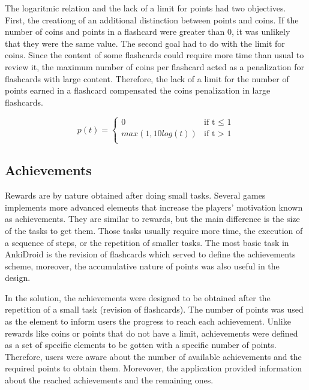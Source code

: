 The logaritmic relation and the lack of a limit for points had two objectives. First, the creationg of an additional distinction between points and coins. If the number of coins and points in a flashcard were greater than 0, it was unlikely that they were the same value. The second goal had to do with the limit for coins. Since the content of some flashcards could require more time than usual to review it, the maximum number of coins per flashcard acted as a penalization for flashcards with large content. Therefore, the lack of a limit for the number of points earned in a flashcard compensated the coins penalization in large flashcards.

\begin{equation}
  p(t) =
      \begin{cases}
        0 & \text{if t $\leq$ 1}\\
        max(1, 10log(t)) & \text{if t $>$ 1}\\
      \end{cases}
    \label{eq:points-formula}
\end{equation}

\subsection{Achievements}
Rewards are by nature obtained after doing small tasks. Several games implements more advanced elements that increase the players' motivation known as achievements. They are similar to rewards, but the main difference is the size of the tasks to get them. Those tasks usually require more time, the execution of a sequence of steps, or the repetition of smaller tasks. The most basic task in AnkiDroid is the revision of flashcards which served to define the achievements scheme, moreover, the accumulative nature of points was also useful in the design.

In the solution, the achievements were designed to be obtained after the repetition of a small task (revision of flashcards). The number of points was used as the element to inform users the progress to reach each achievement. Unlike rewards like coins or points that do not have a limit, achievements were defined as a set of specific elements to be gotten with a specific number of points. Therefore, users were aware about the number of available achievements and the required points to obtain them. Morevover, the application provided information about the reached achievements and the remaining ones.


